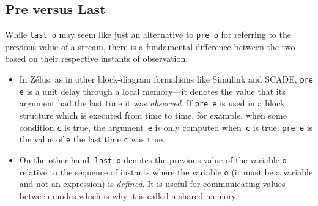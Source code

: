 \documentclass[11pt,titlepage,twoside]{report}
\makeatletter
\newcommand{\zls}[1]{{\@span{class="zelusinline"}#1}}
\newcommand{\zls}[1]{\texttt{#1}}
\renewcommand{\zls}[1]{\texttt{#1}}
\newenvironment{flatitemize}
  {\setenvclass{itemize}{flatitemize}%
   \begin{itemize}}
  {\end{itemize}}
\newenvironment{flatitemize}
  {\begin{itemize}[leftmargin=*]}
  {\end{itemize}}
\newcommand{\zelus}{{\sf Z\'elus}}
\newcommand{\simulink}{{\sf Simulink}}
\newcommand{\scade}{{\sf SCADE}}
\makeatother
\begin{document}
\subsection{Pre versus Last\label{prelast}} %

While \zls{last o} may seem like just an alternative to \zls{pre o} for 
referring to the previous value of a stream, there is a fundamental 
difference between the two based on their respective instants of 
observation.

\begin{flatitemize}
\item
In \zelus{}, as in other block-diagram formalisms like \simulink{} and 
\scade, \zls{pre e} is a unit delay through a local memory---it denotes the 
value that its argument had the last time it was \emph{observed}.
If \zls{pre e} is used in a block structure which is executed from time to 
time, for example, when some condition \zls{c} is true, the argument~\zls{e} 
is only computed when~\zls{c} is true: \zls{pre e} is the value of \zls{e} 
the last time \zls{c} was true.

\item
On the other hand, \zls{last o} denotes the previous value of the variable 
\zls{o} relative to the sequence of instants where the variable \zls{o} (it 
must be a variable and not an expression) is \emph{defined}.
It is useful for communicating values between modes which is why it is 
called a shared memory.
\end{flatitemize}
\end{document}
